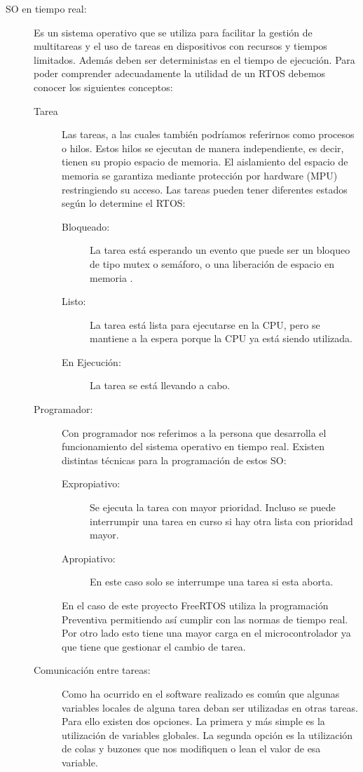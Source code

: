 \begin{description}
\item[SO en tiempo real:\label{ref:SOTiempoReal}] Es un sistema operativo que se utiliza para facilitar la gestión de  multitareas y el uso de tareas en dispositivos con recursos y tiempos limitados. Además deben ser deterministas en el tiempo de ejecución. Para poder comprender adecuadamente la utilidad de un RTOS debemos conocer los siguientes conceptos:
\begin{description}
\item[Tarea] Las tareas, a las cuales también podríamos referirnos como procesos o hilos. Estos hilos se ejecutan de manera independiente, es decir, tienen su propio espacio de memoria. El aislamiento del espacio de memoria se garantiza mediante protección por hardware (MPU) restringiendo su acceso. Las tareas pueden tener diferentes estados según lo determine el RTOS:
	\begin{description}
		\item[Bloqueado:] La tarea está esperando un evento que puede ser un bloqueo de tipo mutex o semáforo, o una liberación de espacio en memoria .
		\item[Listo:] La tarea está lista para ejecutarse en la CPU, pero se mantiene a la espera porque la CPU ya está siendo utilizada.
		\item[En Ejecución:] La tarea se está llevando a cabo.
	\end{description}
\item[Programador:] Con programador nos referimos a la persona que desarrolla el funcionamiento del sistema operativo en tiempo real. Existen distintas técnicas para la programación de estos SO:
	\begin{description}
		\item[Expropiativo:] Se ejecuta la tarea con mayor prioridad. Incluso se puede interrumpir una tarea en curso si hay otra lista con prioridad mayor.
		\item[Apropiativo:] En este caso solo se interrumpe una tarea si esta aborta.
	\end{description}
En el caso de este proyecto FreeRTOS utiliza la programación Preventiva permitiendo así cumplir con las normas de tiempo real. Por otro lado esto tiene una mayor carga en el microcontrolador ya que tiene que gestionar el cambio de tarea.
\item[Comunicación entre tareas:] Como ha ocurrido en el software realizado es común que algunas variables locales de alguna tarea deban ser utilizadas en otras tareas. Para ello existen dos opciones. La primera y más simple es la utilización de variables globales. La segunda opción es la utilización de colas y buzones que nos modifiquen o lean el valor de esa variable.

\end{description}
\end{description}
